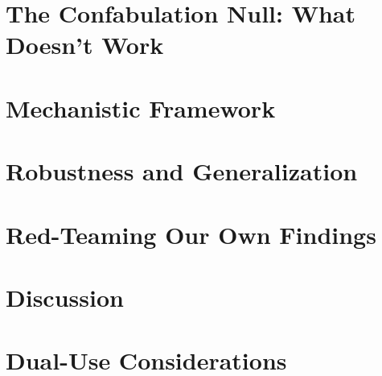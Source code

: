 \documentclass[11pt,a4paper]{article}
\begin{document}
\section{The Confabulation Null: What Doesn't Work}
\label{sec:confabulation}


\section{Mechanistic Framework}
\label{sec:mechanistic}


\section{Robustness and Generalization}
\label{sec:robustness}


\section{Red-Teaming Our Own Findings}
\label{sec:redteam}


\section{Discussion}
\label{sec:discussion}


\section{Dual-Use Considerations}
\label{sec:dualuse}


\end{document}
